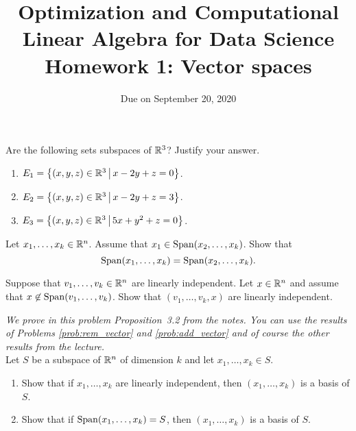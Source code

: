 \documentclass[11pt,nocut]{article}
\title{\vspace{-2.0cm}%
	Optimization and Computational Linear Algebra for Data Science\\
Homework 1: Vector spaces}
\date{\vspace{-1cm}Due on September 20, 2020}
\begin{document}
\maketitle


\begin{problem}[3 points]
	Are the following sets subspaces of $\mathbb{R}^3$? Justify your answer.
	\begin{enumerate}[label=\normalfont(\textbf{\alph*})]
		\item $E_1= \big\{ (x,y,z) \in \mathbb{R}^3 \, \big| \, x - 2y + z= 0 \big\}$.
		\item $E_2= \big\{ (x,y,z) \in \mathbb{R}^3 \, \big| \, x - 2y + z= 3 \big\}$.
		\item $E_3= \big\{ (x,y,z) \in \mathbb{R}^3 \, \big| \, 5x + y^2 + z= 0 \big\}$.
	\end{enumerate}
\end{problem}

\vspace{1mm}

\begin{problem}[2 points]\label{prob:rem_vector}
	Let $x_1, \dots, x_k \in \mathbb{R}^n$. Assume that $x_1 \in {{\rm Span}}(x_2, \dots, x_k)$. Show that
	$$
	{{\rm Span}}(x_1, \dots, x_k) = {{\rm Span}}(x_2, \dots, x_k).
	$$
\end{problem}

\vspace{1mm}

\begin{problem}[2 points]\label{prob:add_vector}
	Suppose that $v_1, \dots, v_k \in \mathbb{R}^n$ are linearly independent. Let $x \in \mathbb{R}^n$ and assume that $x \not\in {{\rm Span}}(v_1,\dots, v_k)$.
	Show that $(v_1,\dots,v_k,x)$ are linearly independent.
\end{problem}

\vspace{1mm}

\begin{problem}[3 points]
	\emph{
		We prove in this problem Proposition~3.2 from the notes. You can use the results of Problems \ref{prob:rem_vector} and \ref{prob:add_vector} and of course the other results from the lecture.
	}
	\\

	Let $S$ be a subspace of $\mathbb{R}^n$ of dimension $k$ and let $x_1, \dots, x_k \in S$.
	\begin{enumerate}[label=\normalfont(\textbf{\alph*})]
		\item Show that if $x_1, \dots, x_k$ are linearly independent, then $(x_1, \dots, x_k)$ is a basis of $S$.
		\item Show that if ${{\rm Span}}(x_1, \dots, x_k) = S$, then $(x_1, \dots, x_k)$ is a basis of $S$.
	\end{enumerate}
\end{problem}
\end{document}
